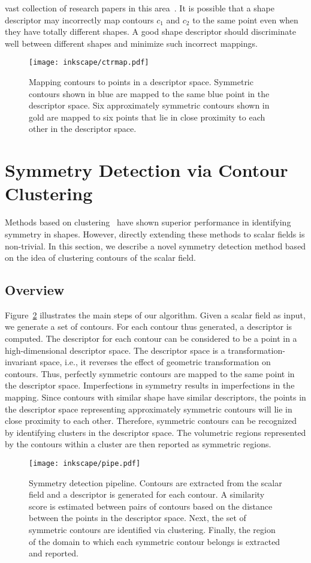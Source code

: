 \documentclass[review,journal]{vgtc}         %
\begin{document}
vast collection of research papers in this 
area~\cite{lian2013,van2011,tangelder2008survey,qin2008content}. 
It is possible that a shape descriptor may incorrectly map contours $c_1$ and 
$c_2$ to the same point even when they have totally different shapes. A good shape descriptor should 
discriminate well between different shapes and minimize such incorrect
mappings. 
\begin{figure}[b]
\centering
{
	\texttt{[image: inkscape/ctrmap.pdf]}
	\caption{\label{ctmap}Mapping contours to points in a descriptor space. Symmetric contours
		shown in blue are mapped to the same blue point in the descriptor space. Six approximately
		symmetric contours shown in gold are mapped to six points that lie in close
		proximity to each other in the descriptor space.}
}
\end{figure}
\section{Symmetry Detection via Contour Clustering}
Methods based on clustering~\cite{Mitra06,Lip10,MitraGP07,Xu12,RavBBK10,Xu09}
have shown superior performance in identifying
symmetry in shapes. However, directly extending these methods to scalar fields
is non-trivial. In this section, we describe a novel symmetry detection method
based on the idea of clustering contours of the scalar field.
\subsection{Overview}
Figure~\ref{pipeline} illustrates the main steps of our algorithm.
Given a scalar field as input, we generate a set of contours. For each contour
thus generated, a descriptor is computed. The descriptor for each contour
can be considered to be a point in a high-dimensional 
descriptor space. The descriptor space is a transformation-invariant space,
i.e., it reverses the effect of geometric transformation on contours. Thus, perfectly
symmetric contours are mapped to the same point in the descriptor space.
Imperfections in symmetry results in imperfections in the mapping.
Since contours with similar shape have similar descriptors,
the points in the descriptor space representing approximately symmetric 
contours will lie in close proximity to each other. Therefore, symmetric contours
can be recognized by identifying clusters in the descriptor space. The volumetric
regions represented by the contours within a cluster are then reported as
symmetric regions.
\begin{figure*}[t]
	\centering
		\texttt{[image: inkscape/pipe.pdf]}
	\caption{\label{pipeline} Symmetry detection pipeline. Contours are extracted
		from the scalar field and a descriptor is generated for each contour.
		A similarity score is estimated between pairs of contours based on the
		distance between the points in the descriptor space. Next, the set of symmetric
		contours are identified via clustering. Finally, the region of the domain to
		which each symmetric contour belongs is extracted and reported.}
\end{figure*}
\end{document}
